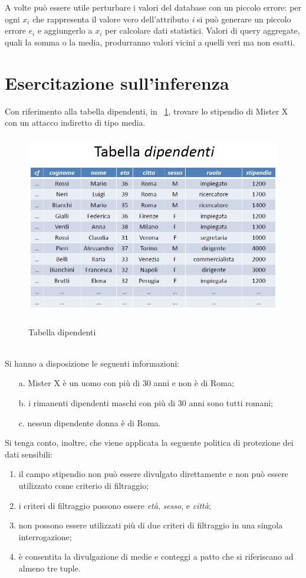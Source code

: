 A volte può essere utile perturbare i valori del database con un piccolo errore: per ogni $x_{i}$ che rappresenta il valore vero dell'attributo \textit{i} si può generare un piccolo errore $e_{i}$ e aggiungerlo a $x_{i}$ per calcolare dati statistici.
Valori di query aggregate, quali la somma o la media, produrranno valori vicini a quelli veri ma non esatti.

\section{Esercitazione sull'inferenza}
Con riferimento alla tabella dipendenti, in \figurename ~\ref{fig:Tabella_dipendenti}, trovare lo stipendio di Mister X con un attacco indiretto di tipo media.
\begin{figure}[htbp]
	\centering%
	\subfigure%
	{\includegraphics[height=8cm, width=12cm, keepaspectratio]{Immagini/dati_sensibili/Tabella_dipendenti.png}}
	\caption{Tabella dipendenti\label{fig:Tabella_dipendenti}} 	
\end{figure}
\\
Si hanno a disposizione le seguenti informazioni:
\begin{enumerate}
\item [a.] Mister X è un uomo con più di 30 anni e non è di Roma;
\item [b.] i rimanenti dipendenti maschi con più di 30 anni sono tutti romani;
\item [c.] nessun dipendente donna è di Roma.
\end{enumerate}
Si tenga conto, inoltre, che viene applicata la seguente politica di protezione dei dati sensibili:
\begin{enumerate}
\item il campo stipendio non può essere divulgato direttamente e non può essere utilizzato come criterio di filtraggio;
\item i criteri di filtraggio possono essere \emph{età}, \emph{sesso}, e \emph{città};
\item non possono essere utilizzati più di due criteri di filtraggio in una singola interrogazione;
\item è consentita la divulgazione di medie e conteggi a patto che si riferiscano ad almeno tre tuple.
\end{enumerate}
